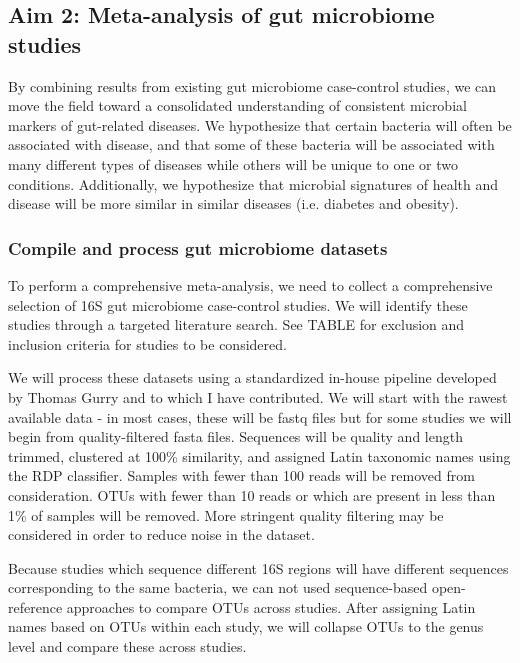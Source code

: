 \documentclass[12pt]{article}
\begin{document}
\subsection{Aim 2: Meta-analysis of gut microbiome studies}\label{sec:aim2}
By combining results from existing gut microbiome case-control studies, we can move the field toward a consolidated understanding of consistent microbial markers of gut-related diseases. We hypothesize that certain bacteria will often be associated with disease, and that some of these bacteria will be associated with many different types of diseases while others will be unique to one or two conditions. Additionally, we hypothesize that microbial signatures  of health and disease will be more similar in similar diseases (i.e. diabetes and obesity).

\subsubsection{Compile and process gut microbiome datasets}
To perform a comprehensive meta-analysis, we need to collect a comprehensive selection of 16S gut microbiome case-control studies. We will identify these studies through a targeted literature search.  See TABLE for exclusion and inclusion criteria for studies to be considered.

We will process these datasets using a standardized in-house pipeline developed by Thomas Gurry and to which I have contributed. We will start with the rawest available data - in most cases, these will be fastq files but for some studies we will begin from quality-filtered fasta files. Sequences will be quality and length trimmed, clustered at 100\% similarity, and assigned Latin taxonomic names using the RDP classifier. Samples with fewer than 100 reads will be removed from consideration. OTUs with fewer than 10 reads or which are present in less than 1\% of samples will be removed. More stringent quality filtering may be considered in order to reduce noise in the dataset.

Because studies which sequence different 16S regions will have different sequences corresponding to the same bacteria, we can not used sequence-based open-reference approaches to compare OTUs across studies. After assigning Latin names based on OTUs within each study, we will collapse OTUs to the genus level and compare these across studies.
\end{document}
